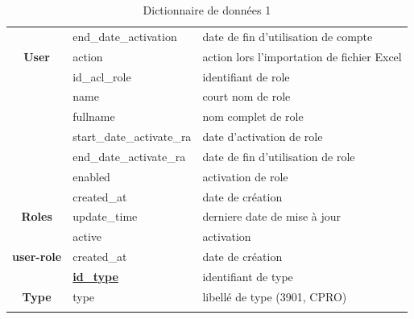\begin{longtable}[c]{|c|l|l|}
	& end\_date\_activation     & date de fin d'utilisation de compte        \\ \cline{2-3} 
	\multirow{-20}{*}{\textbf{User}}                      & action       & action lors l'importation de fichier Excel \\ \hline
	& id\_acl\_role             & identifiant de role                        \\ \cline{2-3} 
	& name                      & court nom de role                          \\ \cline{2-3} 
	& fullname                  & nom complet de role                        \\ \cline{2-3} 
	& start\_date\_activate\_ra & date d'activation de role                  \\ \cline{2-3} 
	& end\_date\_activate\_ra   & date de fin d'utilisation de role          \\ \cline{2-3} 
	& enabled                   & activation de role                         \\ \cline{2-3} 
	& created\_at               & date de création                           \\ \cline{2-3} 
	\multirow{-8}{*}{\textbf{Roles}}                      & update\_time & derniere date de mise à jour               \\ \hline
	& active                    & activation                                 \\ \cline{2-3} 
	\multirow{-2}{*}{\textbf{user-role}} & created\_at               & date de création                           \\ \hline
	& {\ul \textbf{id\_type}}   & identifiant de type                        \\ \cline{2-3} 
	\multirow{-2}{*}{\textbf{Type}}      & type                      & libellé de type (3901, CPRO)               \\ \hline
	\captionsetup{justification=centering}
	\caption{Dictionnaire de données 1}
	\label{tab:dictio-1}\\
\end{longtable}
\newpage
